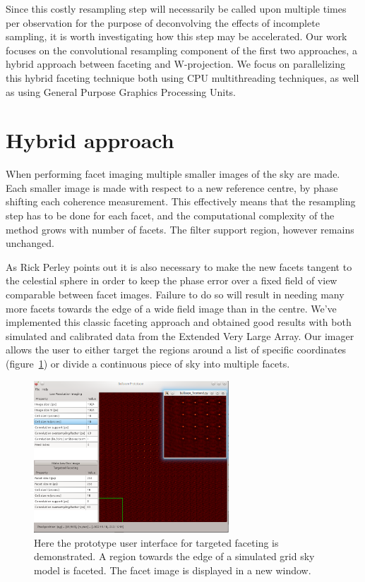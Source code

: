 \documentclass[a4paper,10pt]{article}
\begin{document}
Since this costly resampling step will necessarily be called upon multiple times per observation for the purpose of deconvolving the 
effects of incomplete sampling, it is worth investigating how this step may be accelerated. Our work focuses on the convolutional 
resampling component of the first two approaches, a hybrid approach between faceting and W-projection. We focus on parallelizing
this hybrid faceting technique both using CPU multithreading techniques, as well as using General Purpose Graphics 
Processing Units.
\section{Hybrid approach}
When performing facet imaging multiple smaller images of the sky are made. Each smaller image is made with respect to a new reference
centre, by phase shifting each coherence measurement. This effectively means that the resampling step has to be done for each
facet, and the computational complexity of the method grows with number of facets. The filter support region, however remains unchanged.

As Rick Perley \cite{perley1999imaging} points out it is also necessary to make the new facets tangent to the celestial sphere in order 
to keep the phase error over a fixed field of view comparable between facet images. Failure to do so will result in needing many
more facets towards the edge of a wide field image than in the centre. We've implemented this classic faceting approach and obtained
good results with both simulated and calibrated data from the Extended Very Large Array. Our imager allows the user to either target the 
regions around a list of specific coordinates (figure~\ref{FIG_BULLSEYE}) or divide a continuous piece of sky into multiple facets.

\begin{figure}[h!]
 \centering
 \includegraphics[width=0.65\textwidth]{images/targeted_faceting.png}
 \caption[Targeted faceting]{Here the prototype user interface for targeted faceting is demonstrated. A region towards the edge
 of a simulated grid sky model is faceted. The facet image is displayed in a new window.}
 \label{FIG_BULLSEYE}
\end{figure}
\end{document}
